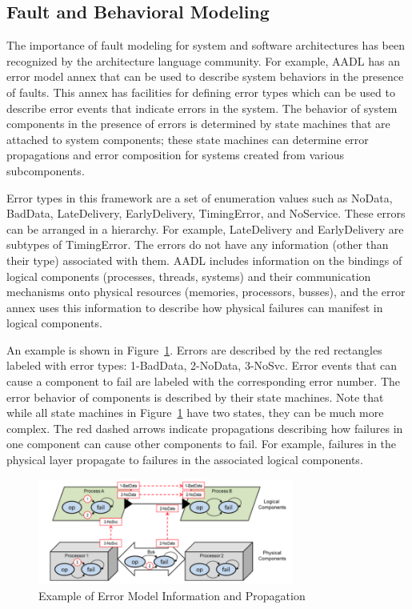\subsection{Fault and Behavioral Modeling}

The importance of fault modeling for system and software architectures has been recognized by the architecture language community. For example, AADL has an error model annex \cite{SAEAS} that can be used to describe system behaviors in the presence of faults. This annex has facilities for defining error types which can be used to describe error events that indicate errors in the system. The behavior of system components in the presence of errors is determined by state machines that are attached to system components; these state machines can determine error propagations and error composition for systems created from various subcomponents.

Error types in this framework are a set of enumeration values such as NoData, BadData, LateDelivery, EarlyDelivery, TimingError, and NoService. These errors can be arranged in a hierarchy. For example, LateDelivery and EarlyDelivery are subtypes of TimingError. The errors do not have any information (other than their type) associated with them. AADL includes information on the bindings of logical components (processes, threads, systems) and their communication mechanisms onto physical resources (memories, processors, busses), and the error annex uses this information to describe how physical failures can manifest in logical components.

An example is shown in Figure~\ref{fig:error_annex}. Errors are described by the red rectangles labeled with error types: 1-BadData, 2-NoData, 3-NoSvc. Error events that can cause a component to fail are labeled with the corresponding error number. The error behavior of components is described by their state machines. Note that while all state machines in Figure~\ref{fig:error_annex} have two states, they can be much more complex. The red dashed arrows indicate propagations describing how failures in one component can cause other components to fail. For example, failures in the physical layer propagate to failures in the associated logical components.

\begin{figure}
  \centering
 \includegraphics[width=0.75\textwidth]{images/error_annex.png}
  \vspace{-0.1in}
  \caption{Example of Error Model Information and Propagation}
  \label{fig:error_annex}
\end{figure}

